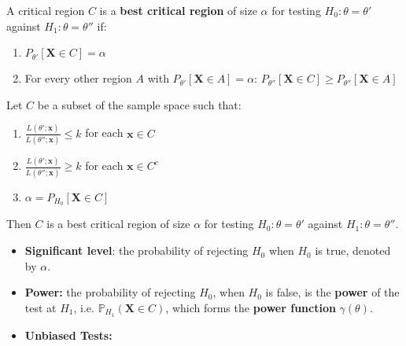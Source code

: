 \begin{definition}
A critical region $C$ is a \textbf{best critical region} of size $\alpha$ for testing $H_0: \theta = \theta'$ against $H_1: \theta = \theta''$ if:
	\begin{enumerate}
		\item $P_{\theta'}[\mathbf{X} \in C] = \alpha$
		\item For every other region $A$ with $P_{\theta'}[\mathbf{X} \in A] = \alpha$: $P_{\theta''}[\mathbf{X} \in C] \geq P_{\theta''}[\mathbf{X} \in A]$
	\end{enumerate}
\end{definition}
\begin{theorem}
Let $C$ be a subset of the sample space such that:
	\begin{enumerate}
		\item $\frac{L(\theta'; \mathbf{x})}{L(\theta''; \mathbf{x})} \leq k$ for each $\mathbf{x} \in C$
		\item $\frac{L(\theta'; \mathbf{x})}{L(\theta''; \mathbf{x})} \geq k$ for each $\mathbf{x} \in C^c$
		\item $\alpha = P_{H_0}[\mathbf{X} \in C]$
	\end{enumerate}
Then $C$ is a best critical region of size $\alpha$ for testing $H_0: \theta = \theta'$ against $H_1: \theta = \theta''$.
\end{theorem}
\begin{itemize}
	\item \textbf{Significant level}: the probability of rejecting $H_0$ when $H_0$ is true, denoted by $\alpha$.
	\item \textbf{Power:} the probability of rejecting $H_0$, when $H_0$ is false, is the \textbf{power} of the test at $H_1$, i.e. $\mathbb{P}_{H_1}(\mathbf{X}\in C)$, which forms the \textbf{power function} $\gamma(\theta)$.
	\item \textbf{Unbiased Tests:}
\end{itemize}

